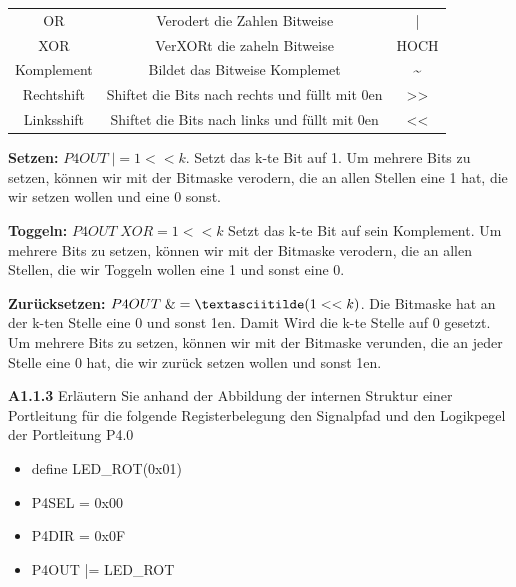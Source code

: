 \documentclass[a4paper,ngerman]{article}
\begin{document}
\begin{description}
\begin{tabular}{c|c|c}
OR & Verodert die Zahlen Bitweise & | \\

XOR &  VerXORt die zaheln Bitweise & HOCH \\

Komplement &  Bildet das Bitweise Komplemet & \textasciitilde \\

Rechtshift & Shiftet die Bits nach rechts und füllt mit 0en & >>\\

Linksshift & Shiftet die Bits nach links und füllt mit 0en & <<\\

\end{tabular}

\begin{description}

\item{\bfseries Setzen:} $P4OUT \; |= 1<< k$. Setzt das k-te Bit auf 1. Um mehrere Bits zu setzen, können wir mit der Bitmaske verodern, die an allen Stellen eine 1 hat, die wir setzen wollen und eine 0 sonst.

\item{\bfseries Toggeln:} $P4OUT \;  XOR= 1<<k$ Setzt das k-te Bit auf sein Komplement. Um mehrere Bits zu setzen, können wir mit der Bitmaske verodern, die an allen Stellen, die wir Toggeln wollen eine 1 und sonst eine 0.

\item{\bfseries Zurücksetzen:} $P4OUT \; \&= \textasciitilde (1<<k)$. Die Bitmaske hat an der k-ten Stelle eine 0 und sonst 1en. Damit Wird die k-te Stelle auf 0 gesetzt. Um mehrere Bits zu setzen, können wir mit der Bitmaske verunden, die an jeder Stelle eine 0 hat, die wir zurück setzen wollen und sonst 1en.

\end{description}

\item{\bfseries A1.1.3} Erläutern Sie anhand der Abbildung der internen Struktur einer Portleitung für die folgende Registerbelegung den Signalpfad und den Logikpegel der Portleitung P4.0

\begin{itemize}
\item define LED\_ROT(0x01)
\item P4SEL = 0x00
\item P4DIR = 0x0F
\item P4OUT |= LED\_ROT

\end{itemize}


\end{description}
\end{document}
